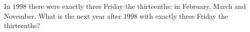 In $1998$ there were exactly three Friday the thirteenths: in February, March and November. What is the next year after $1998$ with exactly three Friday the thirteenths?
